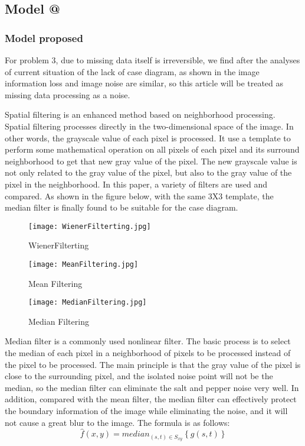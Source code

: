 \documentclass{mcmthesis}
\makeatletter
\newcommand{\Rmnum}[1]{\expandafter\@slowromancap\romannumeral #1@}
\makeatother
\begin{document}
\subsection{Model \Rmnum{2}}
\subsubsection{Model proposed}
For problem 3, due to missing data itself is irreversible, we find after the analyses of current situation of the lack of case diagram, as shown in the image information loss and image noise are similar, so this article will be treated as missing data processing as a noise.

Spatial filtering is an enhanced method based on neighborhood processing. Spatial filtering processes directly in the two-dimensional space of the image. In other words, the grayscale value of each pixel is processed. 
It use a template to perform some mathematical operation on all pixels of each pixel and its surround neighborhood to get that new gray value of the pixel. The new grayscale value is not only related to the gray value of the pixel, but also to the gray value of the pixel in the neighborhood.
In this paper, a variety of filters are used and compared. As shown in the figure below, with the same 3X3 template, the median filter is finally found to be suitable for the case diagram.

\begin{figure}[h]
\centering
\texttt{[image: WienerFilterting.jpg]}
\caption{WienerFilterting} \label{fig: WienerFilterting}
\end{figure}
    

\begin{figure}[h]
\centering
\texttt{[image: MeanFiltering.jpg]}
\caption{Mean Filtering} \label{fig: Mean Filtering}
\end{figure}

\begin{figure}[h]
\centering
\texttt{[image: MedianFiltering.jpg]}
\caption{Median Filtering} \label{fig: Median Filtering}
\end{figure}   

Median filter is a commonly used nonlinear filter. The basic process is to select the median of each pixel in a neighborhood of pixels to be processed instead of the pixel to be processed. The main principle is that the gray value of the pixel is close to the surrounding pixel, and the isolated noise point will not be the median, so the median filter can eliminate the salt and pepper noise very well.
In addition, compared with the mean filter, the median filter can effectively protect the boundary information of the image while eliminating the noise, and it will not cause a great blur to the image.
The formula is as follows:
\begin{equation}
  \hat{f}(x,y) = median_{(s,t)\in {S_{xy}}}\left\{g(s,t)\right\}
\end{equation}
\end{document}
